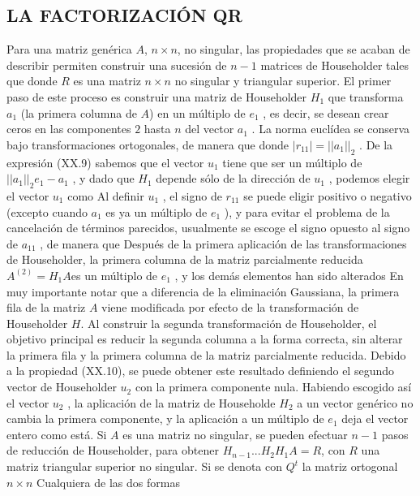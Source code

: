 \documentclass[twocolumn,twoside]{article}
\begin{document}
\subsection{LA FACTORIZACI\'ON QR}
Para una matriz genérica $A$, $n\times n$, no singular, las propiedades que se acaban de
describir permiten construir una sucesión de $n-1$ matrices de Householder tales que
donde $R$ es una matriz $n\times n$ no singular y triangular superior.
El primer paso de este proceso es construir una matriz de Householder $H_1$ que
transforma $a_1$ (la primera columna de $A$) en un múltiplo de $e_1$ , es decir, se desean crear
ceros en las componentes $2$ hasta $n$ del vector $a_1$ . La norma eucl\'idea se conserva bajo
transformaciones ortogonales, de manera que
donde $|r_{11} | = ||a_1||_2$ . De la expresión (XX.9) sabemos que el vector $u_1$ tiene que ser un
múltiplo de $||a_1||_2e_1-a_1$ , y dado que $H_1$ depende sólo de la dirección de $u_1$ , podemos
elegir el vector $u_1$ como
Al definir $u_1$ , el signo de $r_{11}$ se puede eligir positivo o negativo (excepto cuando $a_1$ es
ya un múltiplo de $e_1$ ), y para evitar el problema de la cancelación de términos parecidos,
usualmente se escoge el signo opuesto al signo de $a_11$ , de manera que
Después de la primera aplicación de las transformaciones de Householder, la primera
columna de la matriz parcialmente reducida $A^{(2)}=H_1 A $es un múltiplo de $e_1$ , y los
demás elementos han sido alterados
En muy importante notar que a diferencia de la eliminación Gaussiana, la primera fila de
la matriz $A$ viene modificada por efecto de la transformación de Householder $H$.
Al construir la segunda transformación de Householder, el objetivo principal es reducir
la segunda columna a la forma correcta, sin alterar la primera fila y la primera
columna de la matriz parcialmente reducida. Debido a la propiedad (XX.10), se puede
obtener este resultado definiendo el segundo vector de Householder $u_2$ con la primera
componente nula. Habiendo escogido as\'i el vector $u_2$ , la aplicación de la matriz de
Householde $H_2$ a un vector genérico no cambia la primera componente, y la aplicación a
un múltiplo de $e_1$ deja el vector entero como está.
Si $A$ es una matriz no singular, se pueden efectuar $n-1$ pasos de reducción de
Householder, para obtener $H_{n-1} . . . H_2 H_1 A = R$, con $R$ una matriz triangular superior
no singular. Si se denota con $Q^t$ la matriz ortogonal $n\times n$
Cualquiera de las dos formas
\end{document}

